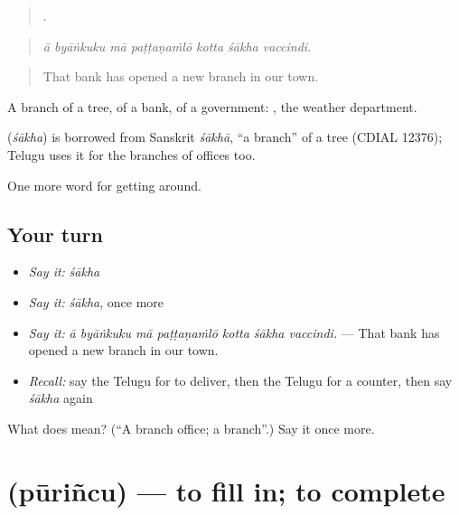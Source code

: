\begin{quote}
      .
\end{quote}

\begin{quote}
\emph{ā byāṅkuku mā paṭṭaṇaṁlō kotta śākha vaccindi.}
\end{quote}

\begin{quote}
That bank has opened a new branch in our town.
\end{quote}

A branch of a tree, of a bank, of a government:  , the weather department.

\begin{cousinweb}
\textbf{} (\emph{śākha}) is borrowed from Sanskrit \emph{śākhā}, \textquotedblleft{}a branch\textquotedblright{} of a tree (CDIAL 12376); Telugu uses it for the branches of offices too.
\end{cousinweb}

\begin{grammarlens}[title={What you've built}]
One more word for getting around.
\end{grammarlens}

\subsection*{Your turn}
\begin{itemize}
\raggedright
  \item \emph{Say it:} \emph{śākha}
  \item \emph{Say it:} \emph{śākha}, once more
  \item \emph{Say it:} \emph{ā byāṅkuku mā paṭṭaṇaṁlō kotta śākha vaccindi.} — That bank has opened a new branch in our town.
  \item \emph{Recall:} say the Telugu for to deliver, then the Telugu for a counter, then say \emph{śākha} again
\end{itemize}

\begin{tcolorbox}[breakable,colback=teal!4,colframe=teal!35!black,title={Before you move on}]
What does  mean? (\textquotedblleft{}A branch office; a branch\textquotedblright{}.) Say it once more.
\end{tcolorbox}
\section[\texorpdfstring{\te{పూరించు} (pūriñcu)}{పూరించు (pūriñcu)}]{ (pūriñcu) — to fill in; to complete}

